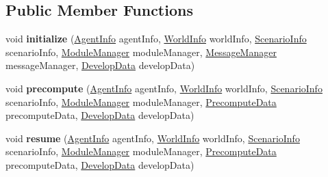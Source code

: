 \subsection*{Public Member Functions}
\begin{DoxyCompactItemize}
\item 
\hypertarget{classadf_1_1launcher_1_1dummy_1_1tactics_1_1DummyTacticsFire_a310015ec3bd973c1c0b204c2d0728688}{}\label{classadf_1_1launcher_1_1dummy_1_1tactics_1_1DummyTacticsFire_a310015ec3bd973c1c0b204c2d0728688} 
void {\bfseries initialize} (\hyperlink{classadf_1_1agent_1_1info_1_1AgentInfo}{Agent\+Info} agent\+Info, \hyperlink{classadf_1_1agent_1_1info_1_1WorldInfo}{World\+Info} world\+Info, \hyperlink{classadf_1_1agent_1_1info_1_1ScenarioInfo}{Scenario\+Info} scenario\+Info, \hyperlink{classadf_1_1agent_1_1module_1_1ModuleManager}{Module\+Manager} module\+Manager, \hyperlink{classadf_1_1agent_1_1communication_1_1MessageManager}{Message\+Manager} message\+Manager, \hyperlink{classadf_1_1agent_1_1develop_1_1DevelopData}{Develop\+Data} develop\+Data)
\item 
\hypertarget{classadf_1_1launcher_1_1dummy_1_1tactics_1_1DummyTacticsFire_aff4e403259b3ec9aeb3c68f4839e3d31}{}\label{classadf_1_1launcher_1_1dummy_1_1tactics_1_1DummyTacticsFire_aff4e403259b3ec9aeb3c68f4839e3d31} 
void {\bfseries precompute} (\hyperlink{classadf_1_1agent_1_1info_1_1AgentInfo}{Agent\+Info} agent\+Info, \hyperlink{classadf_1_1agent_1_1info_1_1WorldInfo}{World\+Info} world\+Info, \hyperlink{classadf_1_1agent_1_1info_1_1ScenarioInfo}{Scenario\+Info} scenario\+Info, \hyperlink{classadf_1_1agent_1_1module_1_1ModuleManager}{Module\+Manager} module\+Manager, \hyperlink{classadf_1_1agent_1_1precompute_1_1PrecomputeData}{Precompute\+Data} precompute\+Data, \hyperlink{classadf_1_1agent_1_1develop_1_1DevelopData}{Develop\+Data} develop\+Data)
\item 
\hypertarget{classadf_1_1launcher_1_1dummy_1_1tactics_1_1DummyTacticsFire_a29d6760bc439d944fca7fa4a0ec9f69d}{}\label{classadf_1_1launcher_1_1dummy_1_1tactics_1_1DummyTacticsFire_a29d6760bc439d944fca7fa4a0ec9f69d} 
void {\bfseries resume} (\hyperlink{classadf_1_1agent_1_1info_1_1AgentInfo}{Agent\+Info} agent\+Info, \hyperlink{classadf_1_1agent_1_1info_1_1WorldInfo}{World\+Info} world\+Info, \hyperlink{classadf_1_1agent_1_1info_1_1ScenarioInfo}{Scenario\+Info} scenario\+Info, \hyperlink{classadf_1_1agent_1_1module_1_1ModuleManager}{Module\+Manager} module\+Manager, \hyperlink{classadf_1_1agent_1_1precompute_1_1PrecomputeData}{Precompute\+Data} precompute\+Data, \hyperlink{classadf_1_1agent_1_1develop_1_1DevelopData}{Develop\+Data} develop\+Data)

\end{DoxyCompactItemize}
